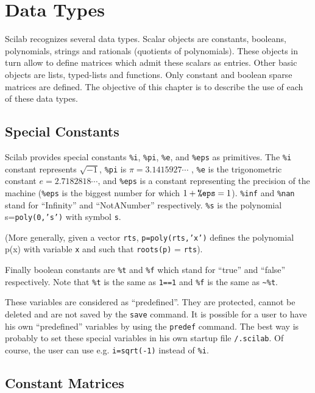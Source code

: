 \chapter{Data Types}
\label{ch2}

Scilab recognizes several data types.
 Scalar objects are constants, booleans, polynomials, strings and 
rationals (quotients of polynomials). These objects in turn allow to 
define matrices which admit these scalars as entries.
Other basic objects are lists, typed-lists and functions. Only
constant and boolean sparse matrices are defined.
%
The objective of this chapter is to describe the use of each of 
these data types.

\section{Special Constants}
\label{s2.1}

	Scilab provides special constants {\tt \%i}, {\tt \%pi},
{\tt \%e}, and {\tt \%eps} as primitives.  The {\tt \%i} constant
represents $\sqrt{-1}$, {\tt \%pi} is $\pi=3.1415927\cdots$ , {\tt \%e}
is the trigonometric constant $e=2.7182818\cdots$, and {\tt \%eps}
is a constant representing the precision of the machine ({\tt \%eps}
is the biggest number for which $1+\mbox{\tt \%eps}=1$). {\tt \%inf}
and {\tt \%nan} stand for ``Infinity'' and ``NotANumber'' respectively.
{\tt \%s} is the polynomial s={\tt poly(0,'s')} with symbol {\tt s}.

(More generally, given a vector {\tt rts}, {\tt p=poly(rts,'x')}
defines the polynomial p(x) with variable {\tt x} and such 
that {\tt roots(p)} = {\tt rts}).

Finally boolean constants are {\tt \%t} and {\tt \%f} which stand for
``true'' and ``false'' respectively. Note that {\tt \%t} is the
same as {\tt 1==1} and {\tt \%f} is the same as {\verb!~%t!}.

These variables are considered as ``predefined''. They are protected, cannot 
be deleted and are not saved by the {\tt save} command. It is possible
for a user to have his own ``predefined'' variables by using the
{\tt predef} command. The best way is probably to set these special variables
in his own startup file {\tt <home dir>/.scilab}.
Of course, the user can use e.g. {\tt i=sqrt(-1)} instead of {\tt \%i}.

\section{Constant Matrices}
\label{s2.2}

